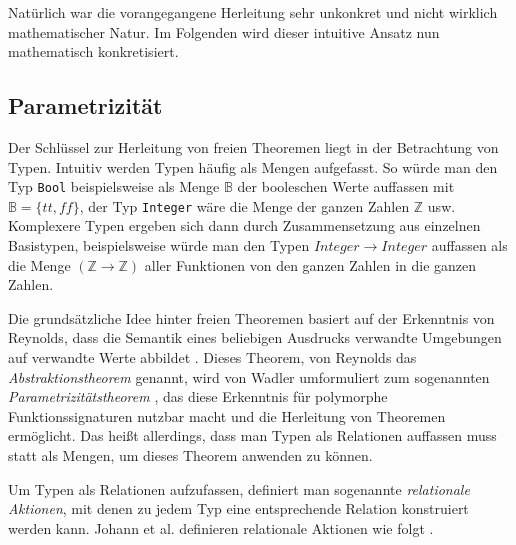 Natürlich war die vorangegangene Herleitung sehr unkonkret und nicht wirklich mathematischer Natur. Im Folgenden wird dieser
intuitive Ansatz nun mathematisch konkretisiert.


\subsection{Parametrizität}

\label{sec:free-theorems-param}

Der Schlüssel zur Herleitung von freien Theoremen liegt in der Betrachtung von Typen.
Intuitiv werden Typen häufig als Mengen aufgefasst. So würde man den Typ \texttt{Bool} beispielsweise als Menge $\mathbb{B}$
der booleschen Werte auffassen mit $\mathbb{B} = \{ tt, ff \}$, der Typ \texttt{Integer} wäre die Menge der ganzen Zahlen
$\mathbb{Z}$ usw. Komplexere Typen ergeben sich dann durch Zusammensetzung aus einzelnen Basistypen, beispielsweise
würde man den Typen \texttt{$Integer \rightarrow Integer$} auffassen als die Menge $(\mathbb{Z} \rightarrow \mathbb{Z})$ aller Funktionen von den ganzen Zahlen in die ganzen Zahlen.

Die grundsätzliche Idee hinter freien Theoremen basiert auf der Erkenntnis von Reynolds, dass die Semantik eines beliebigen
Ausdrucks verwandte Umgebungen auf verwandte Werte abbildet \cite{reynolds}. Dieses Theorem, von Reynolds das
\textit{Abstraktionstheorem} genannt, wird von Wadler umformuliert zum sogenannten \textit{Parametrizitätstheorem} \cite{wadler},
das diese Erkenntnis für polymorphe Funktionssignaturen nutzbar macht und die Herleitung von Theoremen ermöglicht.
Das heißt allerdings, dass man Typen als Relationen auffassen muss statt als Mengen, um dieses Theorem anwenden zu können.

Um Typen als Relationen aufzufassen, definiert man sogenannte \textit{relationale Aktionen}, mit denen zu jedem Typ eine entsprechende Relation
konstruiert werden kann. Johann et al. definieren relationale Aktionen wie folgt \cite{johann2006} .

